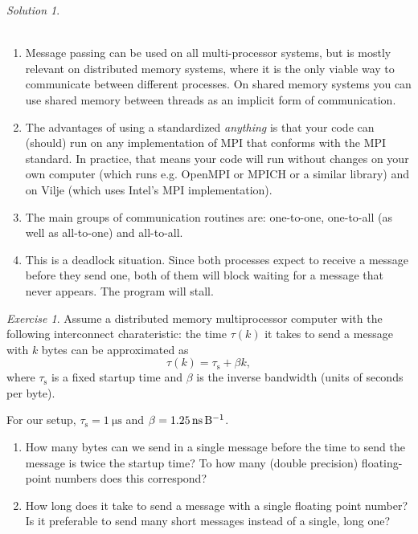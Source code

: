 \documentclass[onecolumn, oneside, a4paper, 11pt]{memoir}
\theoremstyle{remark}
\newtheorem{ex}{Exercise}
\newtheorem*{sol}{Solution}
\begin{document}
\begin{sol} \\~\\
  \begin{enumerate}
  \item Message passing can be used on all multi-processor systems, but is
    mostly relevant on distributed memory systems, where it is the only viable
    way to communicate between different processes. On shared memory systems you
    can use shared memory between threads as an implicit form of communication.
  \item The advantages of using a standardized \emph{anything} is that your code
    can (should) run on any implementation of MPI that conforms with the MPI
    standard. In practice, that means your code will run without changes on your
    own computer (which runs e.g. OpenMPI or MPICH or a similar library) and on
    Vilje (which uses Intel's MPI implementation).
  \item The main groups of communication routines are: one-to-one, one-to-all
    (as well as all-to-one) and all-to-all.
  \item This is a deadlock situation. Since both processes expect to receive a
    message before they send one, both of them will block waiting for a message
    that never appears. The program will stall.
  \end{enumerate}
\end{sol}

\begin{ex}
  Assume a distributed memory multiprocessor computer with the following
  interconnect charateristic: the time $\tau(k)$ it takes to send a message with
  $k$ bytes can be approximated as
  \[
    \tau(k) = \tau_\text{s} + \beta k,
  \]
  where $\tau_\text{s}$ is a fixed startup time and $\beta$ is the inverse
  bandwidth (units of seconds per byte).

  For our setup, $\tau_\text{s} = \SI{1}{\micro\second}$ and
  $\beta = \SI{1.25}{\nano\second\per\byte}$.
  \begin{enumerate}
  \item How many bytes can we send in a single message before the time to send
    the message is twice the startup time? To how many (double precision)
    floating-point numbers does this correspond?
  \item How long does it take to send a message with a single floating point
    number? Is it preferable to send many short messages instead of a single,
    long one?
  \end{enumerate}
\end{ex}
\end{document}
